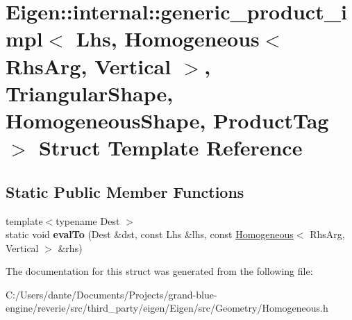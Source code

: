 \hypertarget{struct_eigen_1_1internal_1_1generic__product__impl_3_01_lhs_00_01_homogeneous_3_01_rhs_arg_00_0147df2ec49eff7619c8ef7c3518aa8800}{}\section{Eigen\+::internal\+::generic\+\_\+product\+\_\+impl$<$ Lhs, Homogeneous$<$ Rhs\+Arg, Vertical $>$, Triangular\+Shape, Homogeneous\+Shape, Product\+Tag $>$ Struct Template Reference}
\label{struct_eigen_1_1internal_1_1generic__product__impl_3_01_lhs_00_01_homogeneous_3_01_rhs_arg_00_0147df2ec49eff7619c8ef7c3518aa8800}
\subsection*{Static Public Member Functions}
\begin{DoxyCompactItemize}
\item 
\mbox{\label{struct_eigen_1_1internal_1_1generic__product__impl_3_01_lhs_00_01_homogeneous_3_01_rhs_arg_00_0147df2ec49eff7619c8ef7c3518aa8800_a6dd6d79a824326b33075fc72614f6332}} 
{\footnotesize template$<$typename Dest $>$ }\\static void {\bfseries eval\+To} (Dest \&dst, const Lhs \&lhs, const \mbox{\hyperlink{class_eigen_1_1_homogeneous}{Homogeneous}}$<$ Rhs\+Arg, Vertical $>$ \&rhs)
\end{DoxyCompactItemize}


The documentation for this struct was generated from the following file\+:\begin{DoxyCompactItemize}
\item 
C\+:/\+Users/dante/\+Documents/\+Projects/grand-\/blue-\/engine/reverie/src/third\+\_\+party/eigen/\+Eigen/src/\+Geometry/Homogeneous.\+h\end{DoxyCompactItemize}
